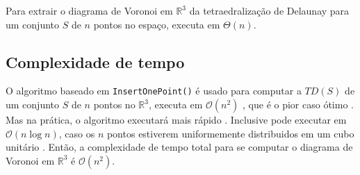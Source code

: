 Para extrair o diagrama de Voronoi em $\mathbb{R}^3$ da tetraedralização de Delaunay
para um conjunto $S$ de $n$ pontos no espaço, executa em $\Theta(n)$.

\subsection{Complexidade de tempo}

O algoritmo baseado em \texttt{InsertOnePoint()} é usado para computar a $TD(S)$
de um conjunto $S$ de $n$ pontos no $\mathbb{R}^3$, executa em $\mathcal{O}(n^2)$ \cite{Ledoux2007},
que é o pior caso ótimo \cite{Edelsbrunner1992}. Mas na prática, o algoritmo 
executará mais rápido \cite{Ledoux2007}. Inclusive pode executar em $\mathcal{O}(n\log n)$,
caso os $n$ pontos estiverem uniformemente distribuidos em um cubo unitário \cite{Edelsbrunner1992}.
Então, a complexidade de tempo total para se computar o diagrama de Voronoi em $\mathbb{R}^3$
é $\mathcal{O}(n^2)$.


